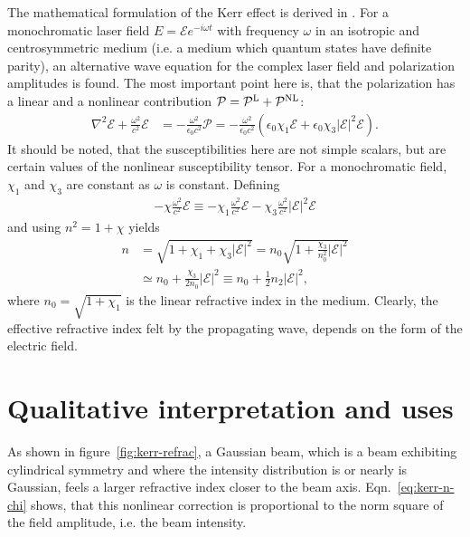 The mathematical formulation of the Kerr effect is derived in
\textcite[sec.~10.3]{milonni}. For a monochromatic laser field $E =
\mathcal{E} e^{-i \omega t}$ with frequency $\omega$ in an isotropic
and centrosymmetric medium (i.e. a medium which quantum states have
definite parity), an alternative wave equation for the complex laser
field and polarization amplitudes is found. The most important point
here is, that the polarization has a linear and a nonlinear
contribution $\mathcal{P} = \mathcal{P}^{\textup L} +
\mathcal{P}^{\textup{NL}}$:
\begin{align}
  \label{eq:kerr-wave-eqn}
  \nabla^2 \mathcal{E} + \frac{\omega^2}{c^2} \mathcal{E}
  &= - \frac{\omega^2}{\epsilon_0 c^2} \mathcal{P}
  = - \frac{\omega^2}{\epsilon_0 c^2} \left( \epsilon_0 \chi_1
    \mathcal{E} + \epsilon_0 \chi_3 |\mathcal{E}|^2 \mathcal{E}
  \right).
\end{align}
It should be noted, that the susceptibilities here are not simple
scalars, but are certain values of the nonlinear susceptibility
tensor. For a monochromatic field, $\chi_1$ and $\chi_3$ are constant
as $\omega$ is constant. Defining 
\begin{align}
  - \chi \frac{\omega^2}{c^2} \mathcal{E}
  \equiv - \chi_1 \frac{\omega^2}{c^2} \mathcal{E}
  - \chi_3 \frac{\omega^2}{c^2} |\mathcal{E}|^2 \mathcal{E}
\end{align}
and using $n^2 = 1 + \chi$ yields
\begin{align}
  n &= \sqrt{1 + \chi_1 + \chi_3 |\mathcal{E}|^2}
  = n_0 \sqrt{1 + \frac{\chi_3}{n_0^2} |\mathcal{E}|^2}
  \\
  &\simeq n_0 + \frac{\chi_3}{2n_0} |\mathcal{E}|^2
  \label{eq:kerr-n-chi}
  \equiv n_0 + \tfrac{1}{2} n_2 |\mathcal{E}|^2,
\end{align}
where $n_0 = \sqrt{1 + \chi_1}$ is the linear refractive index in the
medium. Clearly, the effective refractive index felt by the
propagating wave, depends on the form of the electric field.


\section{Qualitative interpretation and uses}
\label{sec:kerr-interpr}

As shown in figure~\ref{fig:kerr-refrac}, a Gaussian beam, which is a
beam exhibiting cylindrical symmetry and where the intensity
distribution is or nearly is Gaussian, feels a larger refractive index
closer to the beam axis. Eqn.~\eqref{eq:kerr-n-chi} shows, that this
nonlinear correction is proportional to the norm square of the field
amplitude, i.e. the beam intensity.

